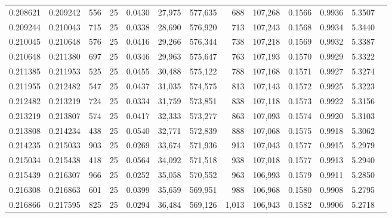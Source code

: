 \begin{tabular}{rrrrrrrrrrrrr}
0.208621 & 0.209242 &   556 &  25 &                                     0.0430 &  27,975 & 577,635 &     688 & 107,268 & 0.1566 & 0.9936 & 5.3507 \\
0.209244 & 0.210043 &   715 &  25 &                                     0.0338 &  28,690 & 576,920 &     713 & 107,243 & 0.1568 & 0.9934 & 5.3440 \\
0.210045 & 0.210648 &   576 &  25 &                                     0.0416 &  29,266 & 576,344 &     738 & 107,218 & 0.1569 & 0.9932 & 5.3387 \\
0.210648 & 0.211380 &   697 &  25 &                                     0.0346 &  29,963 & 575,647 &     763 & 107,193 & 0.1570 & 0.9929 & 5.3322 \\
0.211385 & 0.211953 &   525 &  25 &                                     0.0455 &  30,488 & 575,122 &     788 & 107,168 & 0.1571 & 0.9927 & 5.3274 \\
0.211955 & 0.212482 &   547 &  25 &                                     0.0437 &  31,035 & 574,575 &     813 & 107,143 & 0.1572 & 0.9925 & 5.3223 \\
0.212482 & 0.213219 &   724 &  25 &                                     0.0334 &  31,759 & 573,851 &     838 & 107,118 & 0.1573 & 0.9922 & 5.3156 \\
0.213219 & 0.213807 &   574 &  25 &                                     0.0417 &  32,333 & 573,277 &     863 & 107,093 & 0.1574 & 0.9920 & 5.3103 \\
0.213808 & 0.214234 &   438 &  25 &                                     0.0540 &  32,771 & 572,839 &     888 & 107,068 & 0.1575 & 0.9918 & 5.3062 \\
0.214235 & 0.215033 &   903 &  25 &                                     0.0269 &  33,674 & 571,936 &     913 & 107,043 & 0.1577 & 0.9915 & 5.2979 \\
0.215034 & 0.215438 &   418 &  25 &                                     0.0564 &  34,092 & 571,518 &     938 & 107,018 & 0.1577 & 0.9913 & 5.2940 \\
0.215439 & 0.216307 &   966 &  25 &                                     0.0252 &  35,058 & 570,552 &     963 & 106,993 & 0.1579 & 0.9911 & 5.2850 \\
0.216308 & 0.216863 &   601 &  25 &                                     0.0399 &  35,659 & 569,951 &     988 & 106,968 & 0.1580 & 0.9908 & 5.2795 \\
0.216866 & 0.217595 &   825 &  25 &                                     0.0294 &  36,484 & 569,126 &   1,013 & 106,943 & 0.1582 & 0.9906 & 5.2718 \\

\end{tabular}

